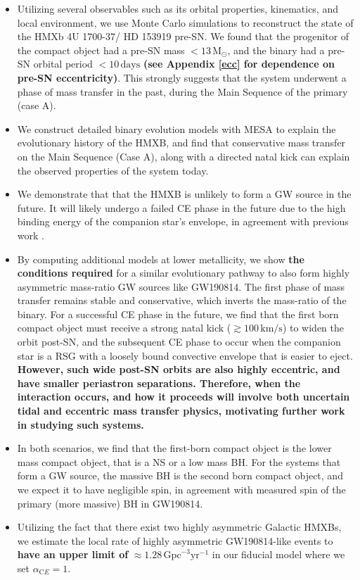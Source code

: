 \documentclass[linenumbers,trackchanges,twocolumn]{aastex701}
\newcommand{\Mdot}{\mathrm{M}_{\odot}}
\begin{document}
\begin{itemize}
\item Utilizing several observables such as its orbital properties, kinematics, and local environment, we use Monte Carlo simulations to reconstruct the state of the HMXb 4U 1700-37/ HD 153919 pre-SN. We found that the progenitor of the compact object had a pre-SN mass $<13\,\Mdot$, and the binary had a pre-SN orbital period $<10\,\mathrm{days}$ \textbf{(see Appendix \ref{ecc} for dependence on pre-SN eccentricity)}. This strongly suggests that the system underwent a phase of mass transfer in the past, during the Main Sequence of the primary (case A).

\item We construct detailed binary evolution models with \textsc{MESA} to explain the evolutionary history of the HMXB, and find that conservative mass transfer on the Main Sequence (Case A), along with a directed natal kick can explain the observed properties of the system today.

\item We demonstrate that that the HMXB is unlikely to form a GW source in the future. It will likely undergo a failed CE phase in the future due to the high binding energy of the companion star's envelope, in agreement with previous work \citep[e.g.,][]{1994MmSAI..65..359P, 2017MNRAS.471.4256V, 2017ApJ...846..170T, 2020A&A...634A..49H}.

\item By computing additional models at lower metallicity, we show \textbf{the conditions required} for a similar evolutionary pathway to also form highly asymmetric mass-ratio GW sources like GW190814. The first phase of mass transfer remains stable and conservative, which inverts the mass-ratio of the binary. For a successful CE phase in the future, we find that the first born compact object must receive a strong natal kick ($\gtrsim 100\,\mathrm{km/s}$) to widen the orbit post-SN, and the subsequent CE phase to occur when the companion star is a RSG with a loosely bound convective envelope that is easier to eject. \textbf{However, such wide post-SN orbits are also highly eccentric, and have smaller periastron separations. Therefore, when the interaction occurs, and how it proceeds will involve both uncertain tidal and eccentric mass transfer physics, motivating further work in studying such systems.}

\item In both scenarios, we find that the first-born compact object is the lower mass compact object, that is a NS or a low mass BH. For the systems that form a GW source, the massive BH is the second born compact object, and we expect it to have negligible spin, in agreement with measured spin of the primary (more massive) BH in GW190814.

\item Utilizing the fact that there exist two highly asymmetric Galactic HMXBs, we estimate the local rate of highly asymmetric GW190814-like events to \textbf{have an upper limit of} $\approx 1.28\,\mathrm{Gpc}^{-3}\mathrm{yr}^{-1}$ in our fiducial model where we set $\alpha_{\mathrm CE} = 1$.
\end{itemize}
\end{document}
